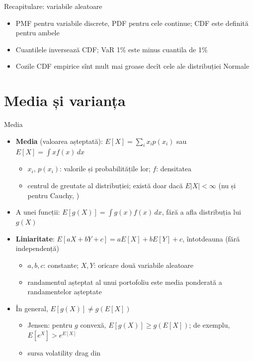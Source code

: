 \begin{frame}{Recapitulare: variabile aleatoare}
\itemsize{\small}
\begin{itemize}
    \item PMF pentru variabile discrete, PDF pentru cele continue; CDF este definită pentru ambele
    \item Cuantilele inversează CDF; VaR 1\% este minus cuantila de 1\%
    \item Cozile CDF empirice sînt mult mai groase decît cele ale distribuției Normale
\end{itemize}
\end{frame}


\section{Media și varianța}

\begin{frame}{Media}
\itemsize{\footnotesize}
\begin{itemize}
    \item \textbf{Media} (valoarea așteptată): $E[X] = \sum_i x_i p(x_i)$ sau $E[X] = \int x f(x)\,dx$
    \begin{itemize}
        \item $x_i$, $p(x_i)$: valorile și probabilitățile lor; $f$: densitatea
        \item centrul de greutate al distribuției; există doar dacă $E|X| < \infty$ (nu și pentru Cauchy, )
    \end{itemize}
    \item A unei funcții: $E[g(X)] = \int g(x) f(x)\,dx$, fără a afla distribuția lui $g(X)$
    \item \textbf{Liniaritate}: $E[aX + bY + c] = aE[X] + bE[Y] + c$, întotdeauna (fără independență)
    \begin{itemize}
        \item $a, b, c$: constante; $X, Y$: oricare două variabile aleatoare
        \item randamentul așteptat al unui portofoliu este media ponderată a randamentelor așteptate
    \end{itemize}
    \item În general, $E[g(X)] \ne g(E[X])$
    \begin{itemize}
        \item Jensen: pentru $g$ convexă, $E[g(X)] \ge g(E[X])$; de exemplu, $E[e^X] > e^{E[X]}$
        \item sursa volatility drag din 
    \end{itemize}
\end{itemize}
\end{frame}

